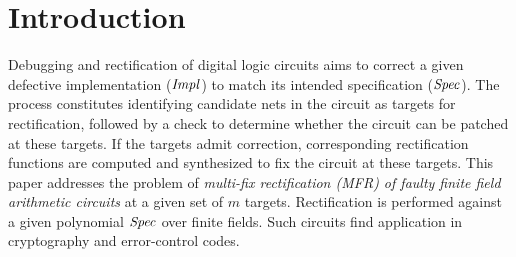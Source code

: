 \section{Introduction}
Debugging and rectification of digital logic circuits aims to correct
a given defective implementation (${\it Impl}$) to match its intended
specification (${\it Spec}$). The process constitutes identifying
candidate nets in the circuit as targets for rectification, followed by  
a check to determine whether the circuit can be patched at these
targets. If the targets admit correction, corresponding rectification
functions are computed and synthesized to fix the circuit at these targets. 
This paper addresses the problem of {\it multi-fix rectification (MFR)
  of faulty finite field arithmetic circuits} at a given set of $m$
targets. Rectification is performed against a 
given polynomial ${\it Spec}$ over finite
fields. Such circuits find application in cryptography and
error-control codes. 

